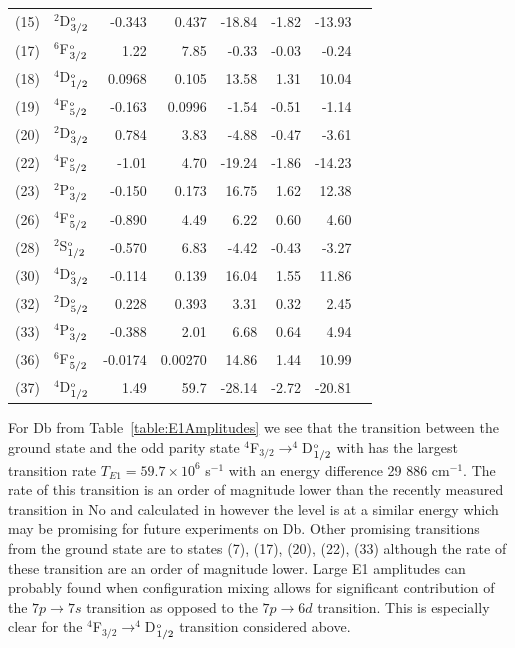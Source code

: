 \documentclass[10pt,a4paper, twoside]{report}
\begin{document}
\begin{table}[t!]
\begin{tabular}{cl@{\hspace{0.75cm}}r@{\hspace{0.75cm}}r@{\hspace{0.75cm}}|r@{\hspace{0.5cm}}r@{\hspace{0.5cm}}r@{\hspace{0.5cm}}r}
 (15) & $^2$D$^{\rm_o}_{3/2}$  &   -0.343  & 0.437 & -18.84 & -1.82 & -13.93   \\
(17)  & $^6$F$^{\rm_o}_{3/2}$  &    1.22  & 7.85 & -0.33 & -0.03 & -0.24 \\
 (18) & $^4$D$^{\rm_o}_{1/2}$  &    0.0968 & 0.105 & 13.58 & 1.31 & 10.04 \\
 (19) & $^4$F$^{\rm_o}_{5/2}$ &    -0.163 & 0.0996& -1.54 & -0.51 & -1.14 \\
 (20) & $^2$D$^{\rm_o}_{3/2}$  &    0.784 & 3.83 & -4.88 & -0.47 & -3.61 \\
 (22) & $^4$F$^{\rm_o}_{5/2}$  &    -1.01 & 4.70  & -19.24 & -1.86 & -14.23 \\
 (23)  & $^2$P$^{\rm_o}_{3/2}$  &   -0.150 & 0.173 & 16.75 & 1.62 & 12.38 \\
 (26) & $^4$F$^{\rm_o}_{5/2}$  &    -0.890 & 4.49  & 6.22 & 0.60 & 4.60 \\
 (28) & $^2$S$^{\rm_o}_{1/2}$ &     -0.570 & 6.83 & -4.42 & -0.43 & -3.27 \\
 (30) & $^4$D$^{\rm_o}_{3/2}$ &   -0.114 & 0.139 & 16.04 & 1.55 & 11.86  \\
 (32) & $^2$D$^{\rm_o}_{5/2}$ &  0.228 & 0.393 & 3.31 & 0.32 & 2.45 \\
 (33)  & $^4$P$^{\rm_o}_{3/2}$ &   -0.388 & 2.01 & 6.68 &  0.64 & 4.94 \\
 (36) & $^6$F$^{\rm_o}_{5/2}$ &    -0.0174   & 0.00270 & 14.86 & 1.44 & 10.99 \\
 (37)  & $^4$D$^{\rm_o}_{1/2}$  &   1.49 & 59.7 & -28.14 & -2.72 & -20.81 \\
\bottomrule
\bottomrule
\end{tabular}
\end{table}

For Db from Table~\ref{table:E1Amplitudes} we see that the  transition between the ground state and the odd parity state $^4$F$_{3/2} \rightarrow ^4$D$^{\rm_o}_{1/2}$ with has the largest transition rate $T_{E1} = 59.7 \times 10^{6}$ s$^{-1}$ with an energy difference 29 886 cm$^{-1}$. The rate of this transition is an order of magnitude lower than the recently measured transition in No \cite{Laatiaoui2016} and calculated in \cite{Borschevsky2007, Indelicato2007, Liu2007} however the level is at a similar energy which may be promising for future experiments on Db. Other promising transitions from the ground state are to states (7), (17), (20), (22), (33) although the rate of these transition are an order of magnitude lower.  
Large E1 amplitudes can probably found when configuration mixing allows for significant contribution of the 
$7p \rightarrow 7s$ transition as opposed to the  $7p \rightarrow 6d$ transition. This is especially clear for the 
$^4$F$_{3/2} \rightarrow ^4$D$^{\rm_o}_{1/2}$ transition considered above.
\end{document}
